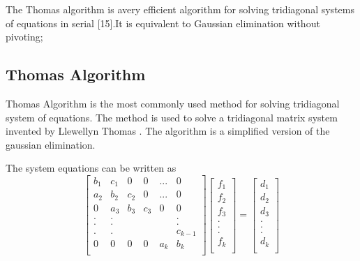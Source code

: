 \documentclass[12pt, oneside]{book}
\theoremstyle{plain}
\theoremstyle{definition}
\begin{document}
The Thomas algorithm is avery efficient algorithm for solving tridiagonal systems of equations in serial [15].It is equivalent to Gaussian elimination without pivoting;

\subsection{Thomas Algorithm}
Thomas Algorithm is the most commonly used method for solving tridiagonal system of equations. The method is used to solve a tridiagonal matrix system invented by Llewellyn Thomas \cite{thomas}. The algorithm is a simplified version of the gaussian elimination.

The system equations can be written as
$$
\begin{bmatrix}  
b_1 & c_1 & 0 & 0 & ... & 0 \\ 
a_2 & b_2 & c_2 & 0 & ... & 0 \\ 
0 & a_3 & b_3 & c_3 & 0 & 0 \\ 
. & . &  &  &  & . \\ 
. & . &  &  &  & . \\ 
. & . &  &  &  & c_{k-1} \\ 
0 & 0 & 0 & 0 & a_k & b_k \\ 
\end{bmatrix} \begin{bmatrix}  
f_1 \\ 
f_2 \\ 
f_3 \\ 
.\\ 
.\\ 
.\\ 
f_k \\ 
\end{bmatrix} = \begin{bmatrix} 
d_1 \\ 
d_2 \\ 
d_3 \\ 
.\\ 
.\\ 
.\\ 
d_k \\ 
\end{bmatrix}
$$
\end{document}
